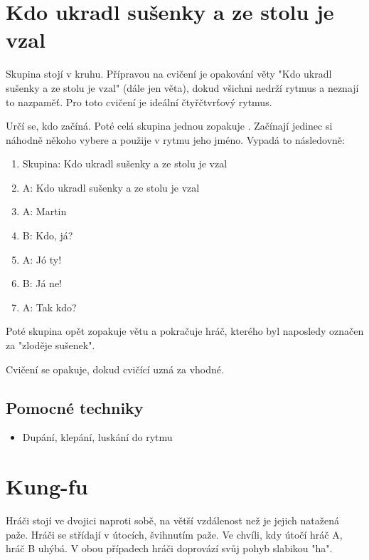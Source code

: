 \documentclass[main.tex]{subfiles}
\begin{document}
 
 
\needspace{5cm} \section{Kdo ukradl sušenky a ze stolu je vzal} \label{kdo ukradl sušenky a ze stolu je vzal} Skupina stojí v kruhu. Přípravou na cvičení je opakování věty "Kdo ukradl sušenky a ze stolu je vzal"{} (dále jen věta), dokud všichni nedrží rytmus a neznají to nazpaměť. Pro toto cvičení je ideální čtyřčtvrťový rytmus. 
 
Určí se, kdo začíná. Poté celá skupina jednou zopakuje . Začínají jedinec si náhodně někoho vybere a použije v rytmu jeho jméno. Vypadá to následovně: 
 
\begin{enumerate}
\item  Skupina: Kdo ukradl sušenky a ze stolu je vzal
\item  A: Kdo ukradl sušenky a ze stolu je vzal
\item  A: Martin
\item  B: Kdo, já?
\item  A: Jó ty!
\item  B: Já ne!
\item  A: Tak kdo?
\end{enumerate}
 
Poté skupina opět zopakuje větu a pokračuje hráč, kterého byl naposledy označen za "zloděje sušenek". 
 
Cvičení se opakuje, dokud cvičící uzná za vhodné. 
 
\subsection{ Pomocné techniky } \begin{itemize}
\item  Dupání, klepání, luskání do rytmu
\end{itemize}
 
 
 
 
 
\needspace{5cm} \section{Kung-fu} \label{kung-fu} Hráči stojí ve dvojici naproti sobě, na větší vzdálenost než je jejich natažená paže. Hráči se střídají v útocích, švihnutím paže. Ve chvíli, kdy útočí hráč A, hráč B uhýbá. V obou případech hráči doprovází svůj pohyb slabikou "ha". 
 
\end{document}
